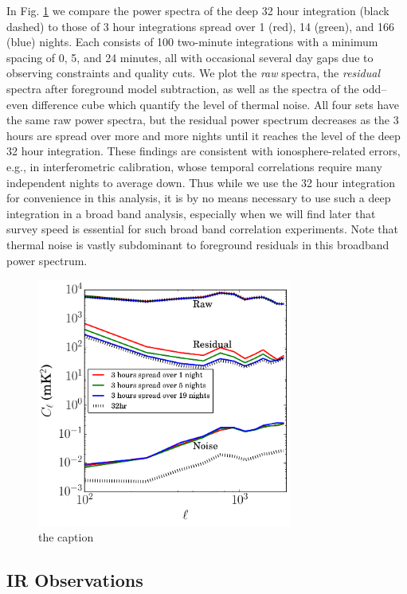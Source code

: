 \documentclass{emulateapj}
\begin{document}
In Fig. \ref{fig:respspecspacingsstudy} we compare the power spectra of the deep 32 hour integration (black dashed) to those of 3 hour integrations spread over 1 (red), 14 (green), and 166 (blue) nights. Each consists of 100 two-minute integrations with a minimum spacing of 0, 5, and 24 minutes, all with occasional several day gaps due to observing constraints and quality cuts. We plot the \textit{raw} spectra, the \textit{residual} spectra after foreground model subtraction, as well as the spectra of the odd--even difference cube which quantify the level of thermal noise. All four sets have the same raw power spectra, but the residual power spectrum decreases as the 3 hours are spread over more and more nights until it reaches the level of the deep 32 hour integration. These findings are consistent with ionosphere-related errors, e.g., in interferometric calibration, whose temporal correlations require many independent nights to average down. Thus while we use the 32 hour integration for convenience in this analysis, it is by no means necessary to use such a deep integration in a broad band analysis, especially when we will find later that survey speed is essential for such broad band correlation experiments. Note that thermal noise is vastly subdominant to foreground residuals in this broadband power spectrum.

\begin{figure}[h]
\centering
\includegraphics[width=3.3in]{images/res_pspec_of_100_obsids_with_diff_spacings.pdf}
\caption{the caption}
\label{fig:respspecspacingsstudy}
\end{figure}

\subsection{IR Observations}
\end{document}
